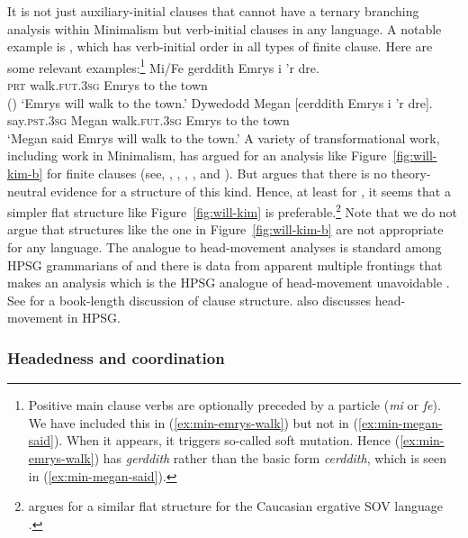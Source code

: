 \documentclass[output=paper,biblatex,babelshorthands,newtxmath,draftmode,colorlinks,citecolor=brown]{langscibook}
\begin{document}
It is not just  auxiliary-initial clauses that cannot have a ternary branching analysis
within Minimalism but verb-initial clauses in any language. A notable example is , which
has verb-initial order in all types of finite clause. Here are some relevant examples:\footnote{%
	Positive main clause verbs are optionally preceded by a particle (\emph{mi} or \emph{fe}). We have included this in (\ref{ex:min-emrys-walk}) but not in (\ref{ex:min-megan-said}). When it appears, it triggers so-called soft mutation. Hence (\ref{ex:min-emrys-walk}) has \emph{gerddith} rather than the basic form \emph{cerddith}, which is seen in (\ref{ex:min-megan-said}).
}
\eal
\ex\label{ex:min-emrys-walk}
\gll Mi/Fe gerddith Emrys i 'r dre.\\
     \textsc{prt} walk.\textsc{fut}.\textsc{3sg} Emrys to the town\\\hfill()
\glt `Emrys will walk to the town.'
\ex\label{ex:min-megan-said}
\gll Dywedodd Megan [cerddith Emrys i 'r dre].\\
     say.\textsc{pst}.\textsc{3sg} Megan \spacebr{}walk.\textsc{fut}.\textsc{3sg} Emrys to the town\\
\glt `Megan said Emrys will walk to the town.'
\zl
A variety of transformational work, including work in Minimalism, has argued for an analysis like Figure~\ref{fig:will-kim-b} for  finite clauses (see, \eg \citealt{JonesThomas.1977}, \citealt{Sproat.1985}, \citealt{Sadler.1988}, \citealt{Rouveret.1994}, and \citealt{Roberts.2005}). But \citet{Borsley.2006b} argues that there is no theory-neutral evidence for a structure of this kind. Hence, at least for , it seems that a simpler flat structure like Figure~\ref{fig:will-kim} is preferable.\footnote{%
	\citet{Borsley.2016} argues for a similar flat structure for the Caucasian ergative SOV language .%
} Note that we do not argue that structures like the one in Figure~\ref{fig:will-kim-b} are not
appropriate for any language. The analogue to head-movement analyses is standard among HPSG grammarians of  and there is data from apparent multiple
frontings that makes an analysis which is the HPSG analogue of head-movement unavoidable \citep{Mueller2003b,Mueller2005d}. See  for a
book-length discussion of  clause structure.  also discusses
head-movement in HPSG.


\subsubsection{Headedness and coordination}
\label{sec-coordination-minimalism}
\end{document}
